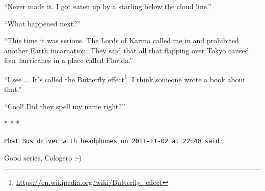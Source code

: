 ``Never made it. I got eaten up by a starling below the cloud line.''

``What happened next?''

``This time it was serious. The Lords of Karma called me in and prohibited another Earth incarnation. They said that all that flapping over Tokyo caused four hurricanes in a place called Florida.''

``I see ... It's called the Butterfly effect\footnote{\url{https://en.wikipedia.org/wiki/Butterfly\_effect}}. I think someone wrote a book about that.''

``Cool! Did they spell my name right?''


\begin{center}* * *\end{center}

\begin{footnotesize}
\begin{sffamily}
\texttt{Phat Bus driver with headphones on 2011-11-02 at 22:40 said:}

Good series, Cologero :-)


\hfill

\end{sffamily}
\end{footnotesize}

